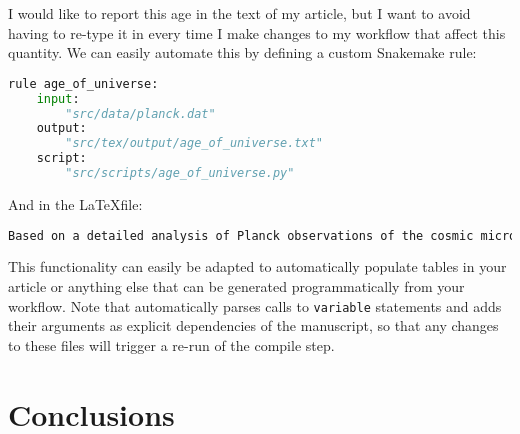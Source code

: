 \documentclass{aa}
\begin{document}
I would like to report this age in the text of my article, but I want to avoid having to re-type it in every time I make changes to my workflow that affect this quantity.
We can easily automate this by defining a custom Snakemake rule:

\begin{lstlisting}[language=python, caption=Snakefile age of universe]
rule age_of_universe:
    input:
        "src/data/planck.dat"
    output:
        "src/tex/output/age_of_universe.txt"
    script:
        "src/scripts/age_of_universe.py"
\end{lstlisting}
And in the \LaTeX file:
\begin{lstlisting}[language=tex, caption=TeX age of universe]
Based on a detailed analysis of Planck observations of the cosmic microwave background, we have determined the age of the universe to be \variable{output/age_of_universe.txt} Gyr.
\end{lstlisting}
This functionality can easily be adapted to automatically populate tables in your article or anything else that can be generated programmatically from your workflow. 
Note that \showyourwork automatically parses calls to \texttt{variable} statements and adds their arguments as explicit dependencies of the manuscript, so that any changes to these files will trigger a re-run of the compile step. 

\section{Conclusions}

\begin{acknowledgements}
\end{acknowledgements}

\end{document}
